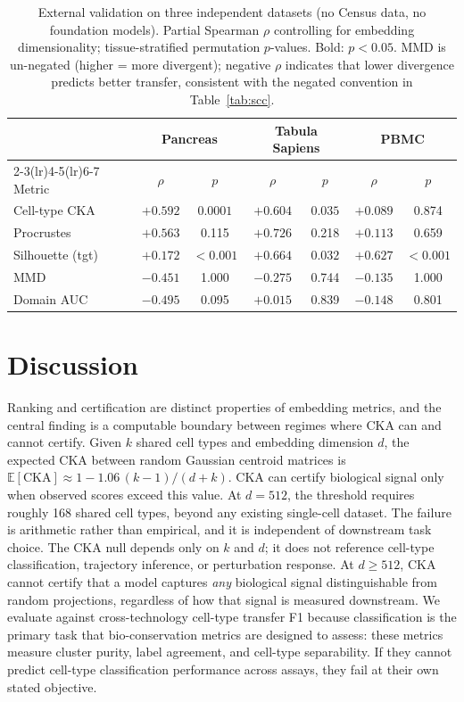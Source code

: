 \documentclass[11pt]{article}
\begin{document}
\begin{table}[t]
\centering
\caption{External validation on three independent datasets (no Census
data, no foundation models). Partial Spearman $\rho$ controlling for
embedding dimensionality; tissue-stratified permutation $p$-values.
Bold: $p < 0.05$. MMD is un-negated (higher = more divergent);
negative $\rho$ indicates that lower divergence predicts better
transfer, consistent with the negated convention in
Table~\ref{tab:scc}.}
\label{tab:external}
\small
\begin{tabular}{@{}lcccccc@{}}
\toprule
& \multicolumn{2}{c}{Pancreas} & \multicolumn{2}{c}{Tabula Sapiens} & \multicolumn{2}{c}{PBMC} \\
\cmidrule(lr){2-3}\cmidrule(lr){4-5}\cmidrule(lr){6-7}
Metric & $\rho$ & $p$ & $\rho$ & $p$ & $\rho$ & $p$ \\
\midrule
Cell-type CKA & $+0.592$ & $\mathbf{0.0001}$ & $+0.604$ & $\mathbf{0.035}$ & $+0.089$ & 0.874 \\
Procrustes    & $+0.563$ & 0.115              & $+0.726$ & 0.218             & $+0.113$ & 0.659 \\
\midrule
Silhouette (tgt) & $+0.172$ & $\mathbf{<0.001}$ & $+0.664$ & $\mathbf{0.032}$ & $+0.627$ & $\mathbf{<0.001}$ \\
MMD              & $-0.451$ & 1.000              & $-0.275$ & 0.744             & $-0.135$ & 1.000 \\
Domain AUC       & $-0.495$ & 0.095              & $+0.015$ & 0.839             & $-0.148$ & 0.801 \\
\bottomrule
\end{tabular}
\end{table}


\section{Discussion}
\label{sec:discussion}

Ranking and certification are distinct properties of embedding metrics,
and the central finding is a computable boundary between regimes where
CKA can and cannot certify. Given $k$ shared cell types and embedding
dimension $d$, the expected CKA between random Gaussian centroid
matrices is $\mathbb{E}[\mathrm{CKA}] \approx 1 -
1.06\,(k{-}1)/(d{+}k)$. CKA can certify biological signal only when
observed scores exceed this value. At $d = 512$, the threshold requires
roughly 168 shared cell types, beyond any existing single-cell dataset.
The failure is arithmetic rather than empirical, and it is independent
of downstream task choice. The CKA null depends only on $k$ and $d$;
it does not reference cell-type classification, trajectory inference,
or perturbation response. At $d \geq 512$, CKA cannot certify that a
model captures \emph{any} biological signal distinguishable from random
projections, regardless of how that signal is measured downstream. We
evaluate against cross-technology cell-type transfer F1 because
classification is the primary task that bio-conservation metrics are
designed to assess: these metrics measure cluster purity, label
agreement, and cell-type separability. If they cannot predict cell-type
classification performance across assays, they fail at their own stated
objective.
\end{document}
